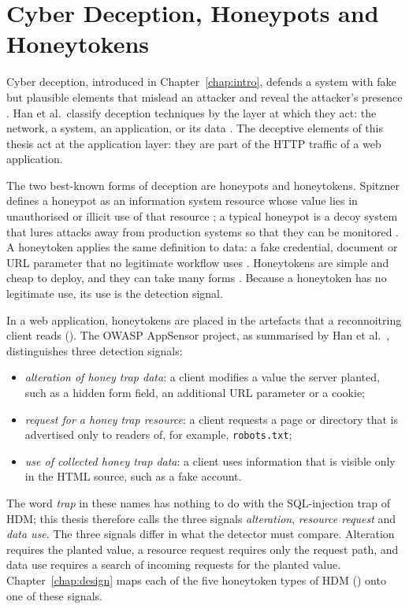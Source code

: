 \documentclass{rptuma}
\begin{document}
\section{Cyber Deception, Honeypots and Honeytokens}
\label{sec:bg.honeytokens}

Cyber deception, introduced in Chapter~\ref{chap:intro}, defends a system with fake but plausible
elements that mislead an attacker and reveal the attacker's presence \cite{zhang2021three}. Han et
al.\ classify deception techniques by the layer at which they act: the network, a system, an
application, or its data \cite{han2018deception}. The deceptive elements of this thesis act at the
application layer: they are part of the HTTP traffic of a web application.

The two best-known forms of deception are honeypots and honeytokens. Spitzner defines a honeypot as
an information system resource whose value lies in unauthorised or illicit use of that resource
\cite{spitzner2003insider}; a typical honeypot is a decoy system that lures attacks away from
production systems so that they can be monitored \cite{denning2014framework}. A honeytoken applies
the same definition to data: a fake credential, document or URL parameter that no legitimate
workflow uses \cite{han2018deception}. Honeytokens are simple and cheap to deploy, and they can take
many forms \cite{zhang2021three}. Because a honeytoken has no legitimate use, its use is the
detection signal.

In a web application, honeytokens are placed in the artefacts that a reconnoitring client reads
(). The OWASP AppSensor project, as summarised by Han et al.\
\cite{han2017evaluation}, distinguishes three detection signals:
\begin{itemize}
  \item \emph{alteration of honey trap data}: a client modifies a value the server planted, such as
    a hidden form field, an additional URL parameter or a cookie;
  \item \emph{request for a honey trap resource}: a client requests a page or directory that is
    advertised only to readers of, for example, \texttt{robots.txt};
  \item \emph{use of collected honey trap data}: a client uses information that is visible only in
    the HTML source, such as a fake account.
\end{itemize}
The word \emph{trap} in these names has nothing to do with the SQL-injection trap of HDM; this
thesis therefore calls the three signals \emph{alteration}, \emph{resource request} and \emph{data
use}.
The three signals differ in what the detector must compare. Alteration requires the planted value,
a resource request requires only the request path, and data use requires a search of incoming
requests for the planted value. Chapter~\ref{chap:design} maps each of the five honeytoken types
of HDM (\secrefp{sec:intro.hdm}) onto one of these signals.
\end{document}
